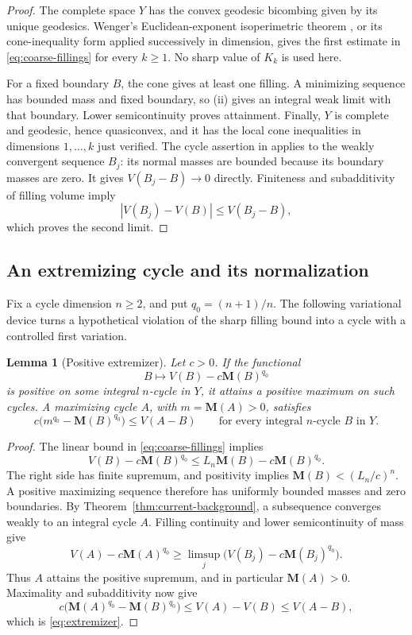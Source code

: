 \documentclass[11pt]{article}
\numberwithin{equation}{section}
\newtheorem{lemma}[theorem]{Lemma}
\theoremstyle{definition}
\theoremstyle{remark}
\begin{document}
\begin{proof}
The complete space \(Y\) has the convex geodesic bicombing given by its
unique geodesics. Wenger's Euclidean-exponent isoperimetric theorem
\cite[Theorem~1.2 and Corollary~1.4]{Wenger2005Iso}, or its cone-inequality
form applied successively in dimension, gives the first estimate in
\eqref{eq:coarse-fillings} for every \(k\ge1\). No sharp value of
\(K_k\) is used here.

For a fixed boundary \(B\), the cone gives at least one filling. A
minimizing sequence has bounded mass and fixed boundary, so (ii) gives
an integral weak limit with that boundary. Lower semicontinuity proves
attainment. Finally, \(Y\) is complete and geodesic, hence quasiconvex,
and it has the local cone inequalities in dimensions \(1,\ldots,k\)
just verified. The cycle assertion in
\cite[Theorem~1.4]{Wenger2007Flat} applies to the weakly convergent
sequence \(B_j\): its normal masses are bounded because its boundary
masses are zero. It gives \(V(B_j-B)\to0\) directly. Finiteness and
subadditivity of filling volume imply
\[
 |V(B_j)-V(B)|\le V(B_j-B),
\]
which proves the second limit.
\end{proof}

\subsection{An extremizing cycle and its normalization}

Fix a cycle dimension \(n\ge2\), and put \(q_0=(n+1)/n\).
The following variational device turns a hypothetical violation of the
sharp filling bound into a cycle with a controlled first variation.

\begin{lemma}[Positive extremizer]
\label{lem:extremizer}
Let \(c>0\). If the functional
\[
 B\longmapsto V(B)-c\mathbf M(B)^{q_0}
\]
is positive on some integral \(n\)-cycle in \(Y\), it attains a positive
maximum on such cycles. A maximizing cycle \(A\), with
\(m=\mathbf M(A)>0\), satisfies
\begin{equation}
\label{eq:extremizer}
 c\bigl(m^{q_0}-\mathbf M(B)^{q_0}\bigr)\le V(A-B)
 \qquad\text{for every integral \(n\)-cycle }B\text{ in }Y.
\end{equation}
\end{lemma}

\begin{proof}
The linear bound in \eqref{eq:coarse-fillings} implies
\[
 V(B)-c\mathbf M(B)^{q_0}\le L_n\mathbf M(B)-c\mathbf M(B)^{q_0}.
\]
The right side has finite supremum, and positivity implies
\(\mathbf M(B)<(L_n/c)^n\). A positive maximizing sequence therefore has
uniformly bounded masses and zero boundaries. By
Theorem~\ref{thm:current-background}, a subsequence converges weakly to an
integral cycle \(A\). Filling continuity and lower semicontinuity of
mass give
\[
 V(A)-c\mathbf M(A)^{q_0}
 \ge\limsup_j\bigl(V(B_j)-c\mathbf M(B_j)^{q_0}\bigr).
\]
Thus \(A\) attains the positive supremum, and in particular
\(\mathbf M(A)>0\). Maximality and subadditivity now give
\[
 c\bigl(\mathbf M(A)^{q_0}-\mathbf M(B)^{q_0}\bigr)
 \le V(A)-V(B)\le V(A-B),
\]
which is \eqref{eq:extremizer}.
\end{proof}
\end{document}

